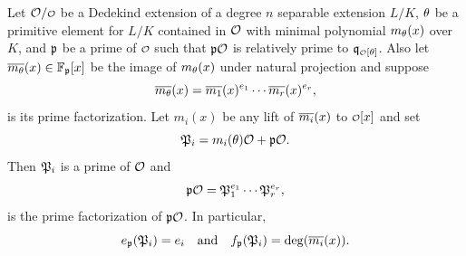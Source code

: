     \begin{theorem*}
      Let \(\mc{O}/\smc{O}\) be a Dedekind extension of a degree \(n\) separable extension \(L/K\), \(\theta\) be a primitive element for \(L/K\) contained in \(\mathcal{O}\) with minimal polynomial \(m_{\theta}(x)\) over \(K\), and \(\mathfrak{p}\) be a prime of \(\smc{O}\) such that \(\mathfrak{p}\mathcal{O}\) is relatively prime to \(\mf{q}_{\smc{O}[\t]}\). Also let \(\overline{m_{\theta}}(x) \in \mathbb{F}_{\mathfrak{p}}[x]\) be the image of \(m_{\theta}(x)\) under natural projection and suppose
      \[
        \overline{m_{\theta}}(x) = \overline{m_{1}}(x)^{e_{1}} \cdots \overline{m_{r}}(x)^{e_{r}},
      \]
      is its prime factorization. Let \(m_{i}(x)\) be any lift of \(\overline{m_{i}}(x)\) to \(\smc{O}[x]\) and set
      \[
        \mathfrak{P}_{i} = m_{i}(\theta)\mathcal{O}+\mathfrak{p}\mathcal{O}.
      \]
      Then \(\mathfrak{P}_{i}\) is a prime of \(\mathcal{O}\) and
      \[
        \mathfrak{p}\mathcal{O} = \mathfrak{P}_{1}^{e_{1}} \cdots \mathfrak{P}_{r}^{e_{r}},
      \]
      is the prime factorization of \(\mathfrak{p}\mathcal{O}\). In particular,
      \[
        e_{\mathfrak{p}}(\mathfrak{P}_{i}) = e_{i} \quad \text{and} \quad f_{\mathfrak{p}}(\mathfrak{P}_{i}) = \deg(\overline{m_{i}}(x)).
      \]
    \end{theorem*}
